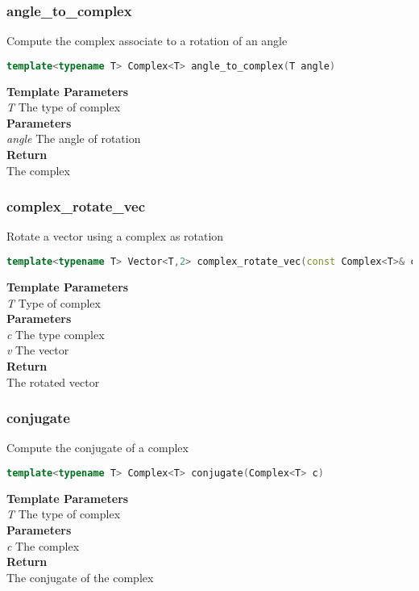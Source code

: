 \subsubsection{angle\_to\_complex}
\begin{mdframed}
Compute the complex associate to a rotation of an angle
\begin{lstlisting}[language=C++]
template<typename T> Complex<T> angle_to_complex(T angle) 
\end{lstlisting}
\textbf{Template Parameters} \\ 
\textit{T} The type of complex \\ 
\textbf{Parameters} \\ 
\textit{angle} The angle of rotation \\ 
\textbf{Return} \\ 
The complex\\ 
\end{mdframed}

\subsubsection{complex\_rotate\_vec}
\begin{mdframed}
Rotate a vector using a complex as rotation
\begin{lstlisting}[language=C++]
template<typename T> Vector<T,2> complex_rotate_vec(const Complex<T>& c, Vector<T,2> v) 
\end{lstlisting}
\textbf{Template Parameters} \\ 
\textit{T} Type of complex \\ 
\textbf{Parameters} \\ 
\textit{c} The type complex \\ 
\textit{v} The vector \\ 
\textbf{Return} \\ 
The rotated vector\\ 
\end{mdframed}

\subsubsection{conjugate}
\begin{mdframed}
Compute the conjugate of a complex
\begin{lstlisting}[language=C++]
template<typename T> Complex<T> conjugate(Complex<T> c) 
\end{lstlisting}
\textbf{Template Parameters} \\ 
\textit{T} The type of complex \\ 
\textbf{Parameters} \\ 
\textit{c} The complex \\ 
\textbf{Return} \\ 
The conjugate of the complex\\ 
\end{mdframed}

